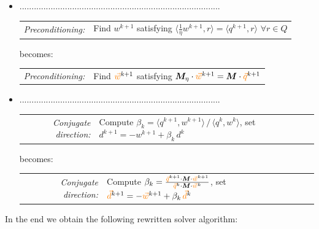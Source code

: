 \begin{itemize}
\item ....................................................................................
\begin{algobox}{}
\begin{tabular}{@{}r@{\quad}l@{}}
\textit{Preconditioning:} & Find $w^{k+1}$ satisfying $\langle \tfrac{1}{\eta} w^{k+1}, r \rangle = \langle q^{k+1}, r \rangle$ \; $\forall r \in Q$ 
\end{tabular} 
\end{algobox}
becomes:
\begin{algobox}{}
\begin{tabular}{@{}r@{\quad}l@{}}
\textit{Preconditioning:} & Find ${\color{orange} \vec{w}}^{k+1}$ satisfying ${\bm M}_\eta \cdot {\color{orange}\vec{w}}^{k+1} = {\bm M}\cdot {\color{orange}\vec{q}}^{k+1}$
\end{tabular} 
\end{algobox}


\item ....................................................................................
\begin{algobox}{}
\begin{tabular}{@{}r@{\quad}l@{}}
\textit{Conjugate direction:} & Compute $\beta_k = \langle q^{k+1}, w^{k+1} \rangle \,/\, \langle q^k, w^k \rangle$, \; set $d^{k+1} = -w^{k+1} + \beta_k\, d^k$
\end{tabular} 
\end{algobox}
becomes:
\begin{algobox}{}
\begin{tabular}{@{}r@{\quad}l@{}}
\textit{Conjugate direction:} & Compute $\beta_k = 
\frac{{\color{orange}\vec{q}}^{k+1} \cdot {\bm M} \cdot {\color{orange}\vec{w}}^{k+1}}
{ {\color{orange}\vec{q}}^k \cdot{\bm M} \cdot {\color{orange}\vec{w}}^k }
$, \; set ${\color{orange}\vec{d}}^{k+1} = -{\color{orange}\vec{w}}^{k+1} + \beta_k\, {\color{orange}\vec{d}}^k$
\end{tabular} 
\end{algobox}

\end{itemize}


In the end we obtain the following rewritten solver algorithm:

